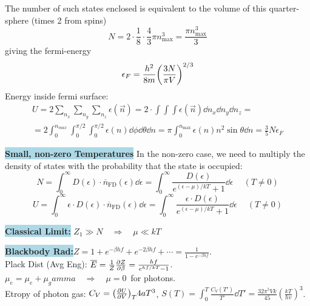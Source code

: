 \documentclass[8pt, a4paper]{extarticle}
\renewcommand{\exp}{e^}
\renewcommand{\exp}{e^}
\renewcommand{\bar}{\overline}
\newcommand{\bll}{\colorbox{lightblue}}
\newcommand{\pd}[3]{\qty(\pdv{#1}{#2})_{#3}}
\begin{document}
\begin{twocolumn}
\begin{framed}
The number of such states enclosed is equivalent to the volume of this quarter-sphere (times 2 from spins)
\vspace{-.2cm}\[
    N = 2\cdot\frac{1}{8}\cdot \frac{4}{3}\pi n_\text{max}^3 = \frac{\pi n_\text{max}^3}{3}
\]\vspace{-.2cm}
giving the fermi-energy
\vspace{-.2cm}\[
    \epsilon_F = \frac{h^2}{8m}\qty(\frac{3N}{\pi V})^{2/3}
\]\vspace{-.2cm}
Energy inside fermi surface:
\begin{align*}
    U = 2 \sum_{n_x}\sum_{n_y}\sum_{n_z} \epsilon(\vec{n}) = 2\cdot\int\int\int \epsilon(\vec{n})\dd{n_x}\dd{n_y}\dd{n_z} =\\
    = 2\int_0^{n_{max}}\int_0^{\pi/2}\int_0^{\pi/2}\epsilon(n)\dd{\phi}\dd{\theta}\dd{n} 
    = \pi\int_0^{n_\text{max}}\epsilon(n)n^2\sin{\theta} \dd{n} = \frac{3}{5}N \epsilon_F
\end{align*}


\bll{\textbf{Small, non-zero Temperatures}}
In the non-zero case, we need to multiply the density of states with the probability that the state is occupied:
\[
    N = \int_0^\infty D(\epsilon)\cdot \bar{n}_\text{FD}(\epsilon) \dd{\epsilon} = \int_0^\infty \frac{D(\epsilon)}{\exp{(\epsilon-\mu)/kT} + 1} \dd{\epsilon} \quad\ (T \neq 0)
\]
\[
    U = \int_0^\infty\epsilon \cdot D(\epsilon)\cdot \bar{n}_\text{FD}(\epsilon) \dd{\epsilon} = \int_0^\infty \frac{\epsilon\cdot D(\epsilon)}{\exp{(\epsilon-\mu)/kT} + 1} \dd{\epsilon} \quad\ (T \neq 0)
\]

\bll{\textbf{Classical Limit:}} $Z_1 \gg N \quad \Rightarrow \quad \mu \ll  kT$
\end{framed}

\bll{\textbf{Blackbody Rad:}}$Z = 1 + \exp{-\beta h f} + \exp{-2\beta h f} + \cdots = \frac{1}{1-\exp{-\beta h f}}$.\\
Plack Dist (Avg Eng): $\bar{E} = \frac{1}{Z}\pdv{Z}{\beta} = \frac{hf}{\exp{hf/kT} - 1}$.\\
$\mu_e = \mu_e + \mu_gamma \quad\Rightarrow\quad \mu = 0$ for photons.\\
Etropy of photon gas: $C_V = \pd{U}{V}{T} 4aT^3$, $S(T) = \int_0^T\frac{C_V(T')}{T'}\dd{T'} = \frac{32\pi^5Vk}{45}(\frac{kT}{hv})^3$.

\end{twocolumn}
\end{document}
